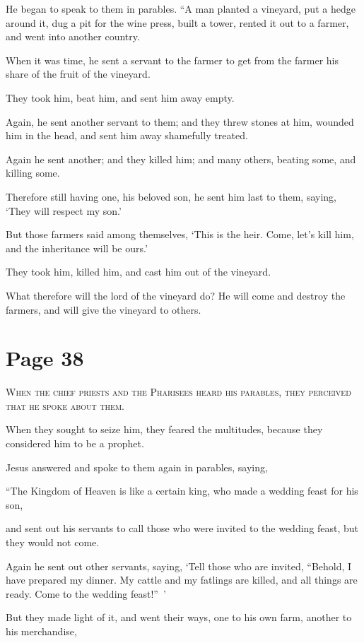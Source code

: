 He began to speak to them in parables. “A man planted a vineyard, put a hedge around it, dug a pit for the wine press, built a tower, rented it out to a farmer, and went into another country.

When it was time, he sent a servant to the farmer to get from the farmer his share of the fruit of the vineyard.

They took him, beat him, and sent him away empty.

Again, he sent another servant to them; and they threw stones at him, wounded him in the head, and sent him away shamefully treated.

Again he sent another; and they killed him; and many others, beating some, and killing some.

Therefore still having one, his beloved son, he sent him last to them, saying, ‘They will respect my son.’

But those farmers said among themselves, ‘This is the heir. Come, let’s kill him, and the inheritance will be ours.’

They took him, killed him, and cast him out of the vineyard.

What therefore will the lord of the vineyard do? He will come and destroy the farmers, and will give the vineyard to others.



\chapterornament
\section*{Page 38}

\lettrine{W}{hen the chief priests and the Pharisees heard his parables, they perceived that he spoke about them.}

When they sought to seize him, they feared the multitudes, because they considered him to be a prophet.

Jesus answered and spoke to them again in parables, saying,

“The Kingdom of Heaven is like a certain king, who made a wedding feast for his son,

and sent out his servants to call those who were invited to the wedding feast, but they would not come.

Again he sent out other servants, saying, ‘Tell those who are invited, “Behold, I have prepared my dinner. My cattle and my fatlings are killed, and all things are ready. Come to the wedding feast!” ’

But they made light of it, and went their ways, one to his own farm, another to his merchandise,

